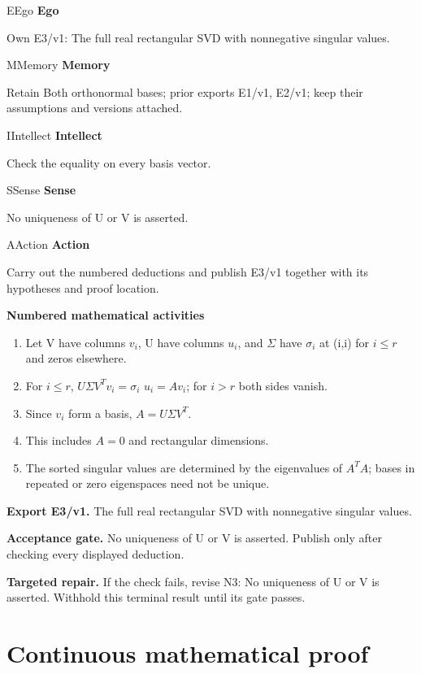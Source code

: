\documentclass[preprint,12pt,aps,pra,showkeys,amsmath,amssymb,superscriptaddress,floatfix]{revtex4-2}
\theoremstyle{definition}
\theoremstyle{remark}
\newcommand{\mmfaculty}[3]{%
 \begin{mmfacultybox}{#1}{#2}
 {\sffamily\bfseries\color{MMBlue}#2}\par\smallskip #3
 \end{mmfacultybox}}
\newcommand{\field}[2]{\par\smallskip\noindent\textbf{#1.} #2\par}
\begin{document}
\mmfaculty{E}{Ego}{Own E3/v1: The full real rectangular SVD with nonnegative singular
values.}

\mmfaculty{M}{Memory}{Retain Both orthonormal bases; prior exports E1/v1, E2/v1; keep their
assumptions and versions attached.}

\mmfaculty{I}{Intellect}{Check the equality on every basis vector.}

\mmfaculty{S}{Sense}{No uniqueness of U or V is asserted.}

\mmfaculty{A}{Action}{Carry out the numbered deductions and publish E3/v1 together with its
hypotheses and proof location.}

\smallskip\noindent\textbf{Numbered mathematical activities}

\begin{enumerate}[label=N3.\arabic*,leftmargin=3.4em]

\item Let V have columns \(v_i\), U have columns \(u_i\), and \(\Sigma\) have
\(\sigma _i\) at (i,i) for \(i\le r\) and zeros elsewhere.

\item For \(i\le r\), \(U\Sigma V^{T}v_i=\sigma _i\) \(u_i=Av_i\); for \(i>r\)
both sides vanish.

\item Since \(v_i\) form a basis, \(A=U\Sigma V^{T}\).

\item This includes \(A=0\) and rectangular dimensions.

\item The sorted singular values are determined by the eigenvalues of
\(A^{T}A\); bases in repeated or zero eigenspaces need not be unique.

\end{enumerate}

\field{Export E3/v1}{The full real rectangular SVD with nonnegative singular values.}

\field{Acceptance gate}{No uniqueness of U or V is asserted. Publish only after checking every
displayed deduction.}

\field{Targeted repair}{If the check fails, revise N3: No uniqueness of U or V is asserted.
Withhold this terminal result until its gate passes.}

\endgroup\clearpage\section{Continuous mathematical proof}\label{sec:proof}
\end{document}
